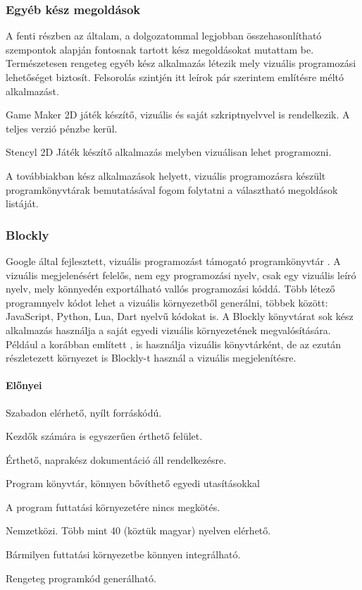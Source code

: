 \documentclass[12pt,a4paper,oneside]{report} %
\begin{document}
\subsubsection{Egyéb kész megoldások}
A fenti részben az általam, a dolgozatommal legjobban összehasonlítható szempontok alapján fontosnak tartott kész megoldásokat mutattam be. Természetesen rengeteg egyéb kész alkalmazás létezik mely vizuális programozási lehetőséget biztosít. Felsorolás szintjén itt leírok pár szerintem említésre méltó alkalmazást. 
\begin{compactitem}
	\item Game Maker \cite{jenson2016exploring} 2D játék készítő, vizuális és saját szkriptnyelvvel is rendelkezik. A teljes verzió pénzbe kerül.
	\item Stencyl \cite{liu2014making} 2D Játék készítő alkalmazás melyben vizuálisan lehet programozni.
\end{compactitem}
A továbbiakban kész alkalmazások helyett, vizuális programozásra készült programkönyvtárak bemutatásával fogom folytatni a választható megoldások listáját.  
\subsubsection{Blockly}
\label{blocly}
Google által fejlesztett, vizuális programozást támogató programkönyvtár \cite{BlocklyUrl2020Feb} \cite{pasternak2017tips}. A vizuális megjelenésért felelős, nem egy programozási nyelv, csak egy vizuális leíró nyelv, mely könnyedén exportálható vallós programozási kóddá. Több létező programnyelv kódot lehet a vizuális környezetből generálni, többek között: JavaScript, Python, Lua, Dart nyelvű kódokat is. A Blockly könyvtárat sok kész alkalmazás használja a saját egyedi vizuális környezetének megvalósítására.
Például a korábban említett ,  is használja vizuális könyvtárként, de az ezután részletezett  környezet is Blockly-t használ a vizuális megjelenítésre.
\paragraph{Előnyei} 
\begin{compactitem}
	\item Szabadon elérhető, nyílt forráskódú.
	\item Kezdők számára is egyszerűen érthető felület.
	\item Érthető, naprakész dokumentáció áll rendelkezésre.
	\item Program könyvtár, könnyen bővíthető egyedi utasításokkal
	\item A program futtatási környezetére nincs megkötés.
	\item Nemzetközi. Több mint 40 (köztük magyar) nyelven elérhető.
	\item Bármilyen futtatási környezetbe könnyen integrálható.
	\item Rengeteg programkód generálható.
\end{compactitem}
\end{document}

